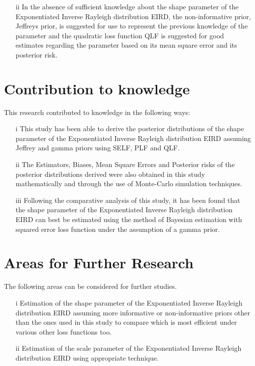 \documentclass[a4paper,12pt]{report}
\begin{document}
{\begin{itemize}
	\item[ii] In the absence of sufficient knowledge about the shape parameter of the Exponentiated Inverse Rayleigh distribution EIRD, the non-informative prior, Jeffreys prior, is suggested for use to represent the previous knowledge of the parameter and the quadratic loss function QLF is suggested for good estimates regarding the parameter based on its mean square error and its posterior risk.
\end{itemize}

\section{Contribution to knowledge}
This research contributed to knowledge in the following ways: 
\begin{itemize}
	\item[i] This study has been able to derive the posterior distributions of the shape parameter of the Exponentiated Inverse Rayleigh distribution EIRD assuming Jeffrey and gamma priors using SELF, PLF and QLF. 
	\item[ii] The Estimators, Biases, Mean Square Errors and Posterior risks of the posterior distributions derived were also obtained in this study mathematically and through the use of Monte-Carlo simulation techniques. 
	\item[iii] Following the comparative analysis of this study, it has been found that the shape parameter of the Exponentiated Inverse Rayleigh distribution EIRD can best be estimated using the method of Bayesian estimation with squared error loss function under the assumption of a gamma prior. 
\end{itemize}


\section{Areas for Further Research}
The following areas can be considered for further studies.
\begin{itemize}
	\item[i] Estimation of the shape parameter of the Exponentiated Inverse Rayleigh distribution EIRD assuming more informative or non-informative priors other than the ones used in this study to compare which is most efficient under various other loss functions too.
	\item[ii] Estimation of the scale parameter of the Exponentiated Inverse Rayleigh distribution EIRD using appropriate technique.
\end{itemize}


}
\end{document}
